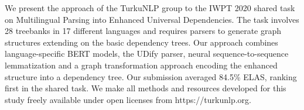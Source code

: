 We present the approach of the TurkuNLP group to the IWPT 2020 shared task on Multilingual Parsing into Enhanced Universal Dependencies. The task involves 28 treebanks in 17 different languages and requires parsers to generate graph structures extending on the basic dependency trees. Our approach combines language-specific BERT models, the UDify parser, neural sequence-to-sequence lemmatization and a graph transformation approach encoding the enhanced structure into a dependency tree. Our submission averaged 84.5\% ELAS, ranking first in the shared task. We make all methods and resources developed for this study freely available under open licenses from https://turkunlp.org.
